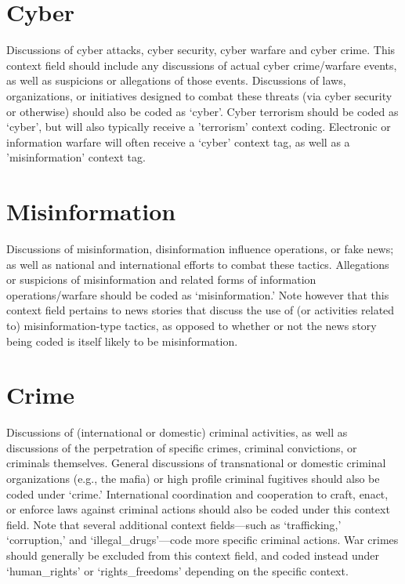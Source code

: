 \documentclass[11pt]{report}
\begin{document}
\section{Cyber}\label{context:cyber}
Discussions of cyber attacks, cyber security, cyber warfare and cyber crime. This context field should include any discussions of actual cyber crime/warfare events, as well as suspicions or allegations of those events. Discussions of laws, organizations, or initiatives designed to combat these threats (via cyber security or otherwise) should also be coded as `cyber'. Cyber terrorism should be coded as `cyber', but will also typically receive a 'terrorism' context coding. Electronic or information warfare will often receive a `cyber' context tag, as well as a 'misinformation' context tag.


\section{Misinformation}\label{context:misinfo}
Discussions of misinformation, disinformation influence operations, or fake news; as well as national and international efforts to combat these tactics. Allegations or suspicions of misinformation and related forms of information operations/warfare should be coded as `misinformation.' Note however that this context field pertains to news stories that discuss the use of (or activities related to) misinformation-type tactics, as opposed to whether or not the news story being coded is itself likely to be misinformation.



\section{Crime}\label{context:crime}

Discussions of (international or domestic) criminal activities, as well as discussions of the perpetration of specific crimes, criminal convictions, or criminals themselves. General discussions of transnational or domestic criminal organizations (e.g., the mafia) or high profile criminal fugitives should also be coded under    `crime.' International coordination and cooperation to craft, enact, or enforce laws against criminal actions should also be coded under this context field. Note that several additional context fields---such as  `trafficking,'  `corruption,' and `illegal\_drugs'---code more specific criminal actions. War crimes should generally be excluded from this context field, and coded instead under `human\_rights' or `rights\_freedoms' depending on the specific context.
\end{document}
